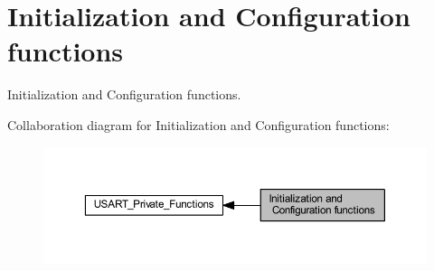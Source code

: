 \hypertarget{group___u_s_a_r_t___group1}{}\section{Initialization and Configuration functions}
\label{group___u_s_a_r_t___group1}


Initialization and Configuration functions.  


Collaboration diagram for Initialization and Configuration functions\+:
\nopagebreak
\begin{figure}[H]
\begin{center}
\leavevmode
\includegraphics[width=350pt]{group___u_s_a_r_t___group1}
\end{center}
\end{figure}
